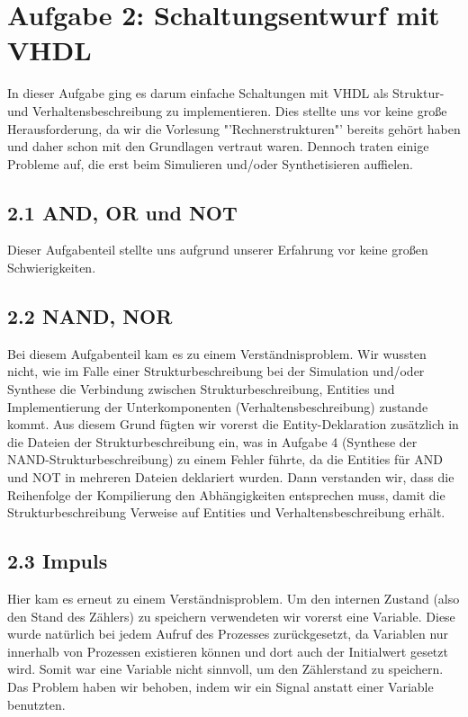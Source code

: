 \documentclass[parskip=full]{scrartcl}
\begin{document}
		
	\section*{Aufgabe 2: Schaltungsentwurf mit VHDL}
		In dieser Aufgabe ging es darum einfache Schaltungen mit VHDL als Struktur- und Verhaltensbeschreibung zu implementieren. Dies stellte uns vor keine große Herausforderung, da wir
		die Vorlesung "'Rechnerstrukturen"' bereits gehört haben und daher schon mit den Grundlagen vertraut waren. Dennoch traten einige Probleme auf, die erst beim Simulieren und/oder Synthetisieren auffielen.
		\subsection*{2.1 AND, OR und NOT}
			Dieser Aufgabenteil stellte uns aufgrund unserer Erfahrung vor keine großen Schwierigkeiten.
		\subsection*{2.2 NAND, NOR}
			Bei diesem Aufgabenteil kam es zu einem Verständnisproblem. Wir wussten nicht, wie im Falle einer Strukturbeschreibung bei der Simulation und/oder Synthese  die Verbindung zwischen
			Strukturbeschreibung, Entities und Implementierung der Unterkomponenten (Verhaltensbeschreibung) zustande kommt. Aus diesem Grund fügten wir vorerst die Entity-Deklaration zusätzlich
			in die Dateien der Strukturbeschreibung ein, was in Aufgabe 4 (Synthese der NAND-Strukturbeschreibung) zu einem Fehler führte, da die Entities für AND und NOT in mehreren Dateien deklariert wurden. Dann verstanden wir, dass die Reihenfolge der Kompilierung den Abhängigkeiten entsprechen muss, damit die Strukturbeschreibung Verweise auf Entities und Verhaltensbeschreibung erhält.
		\subsection*{2.3 Impuls}
			Hier kam es erneut zu einem Verständnisproblem. Um den internen Zustand (also den Stand des Zählers) zu speichern verwendeten wir vorerst eine Variable. Diese wurde natürlich bei jedem Aufruf des Prozesses zurückgesetzt, da Variablen nur innerhalb von Prozessen existieren können und dort auch der Initialwert gesetzt wird. Somit war eine Variable nicht sinnvoll, um den Zählerstand zu speichern. Das Problem haben wir behoben, indem wir ein Signal anstatt einer Variable benutzten.
\end{document}

